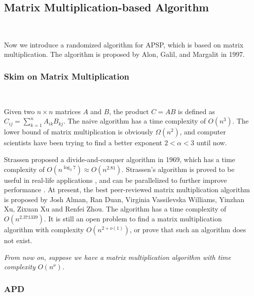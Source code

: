 \documentclass[11pt]{article}
\theoremstyle{plain}
\begin{document}
\subsection{Matrix Multiplication-based Algorithm}\

Now we introduce a randomized algorithm for APSP, which is based on matrix multiplication. The algorithm is proposed by Alon, Galil, and Margalit in 1997\cite{alon1997exponent}.

\subsubsection{Skim on Matrix Multiplication}\

Given two $n\times n$ matrices $A$ and $B$, the product $C=AB$ is defined as $C_{ij}=\sum_{k=1}^n A_{ik}B_{kj}$. The naive algorithm has a time complexity of $O(n^3)$. The lower bound of matrix multiplication is obviously $\Omega(n^2)$, and computer scientists have been trying to find a better exponent $2<\alpha<3$ until now.

Strassen proposed a divide-and-conquer algorithm in 1969, which has a time complexity of $O(n^{\log_2 7})\approx O(n^{2.81})$. Strassen's algorithm is proved to be useful in real-life applications \cite{cite-key}, and can be parallelized to further improve performance \cite{CHOU199549}. At present, the best peer-reviewed matrix multiplication algorithm is proposed by Josh Alman, Ran Duan, Virginia Vassilevska Williams, Yinzhan Xu, Zixuan Xu and Renfei Zhou. The algorithm has a time complexity of $O(n^{2.371339})$\cite{alman2024more}. It is still an open problem to find a matrix multiplication algorithm with complexity $O(n^{2+o(1)})$, or prove that such an algorithm does not exist.

\emph{From now on, suppose we have a matrix multiplication algorithm with time complexity $O(n^\nu)$.}

\subsubsection{APD}\
\end{document}

